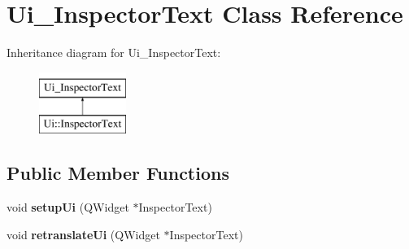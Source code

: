 \hypertarget{class_ui___inspector_text}{}\section{Ui\+\_\+\+Inspector\+Text Class Reference}
\label{class_ui___inspector_text}
Inheritance diagram for Ui\+\_\+\+Inspector\+Text\+:\begin{figure}[H]
\begin{center}
\leavevmode
\includegraphics[height=2.000000cm]{class_ui___inspector_text}
\end{center}
\end{figure}
\subsection*{Public Member Functions}
\begin{DoxyCompactItemize}
\item 
\mbox{\label{class_ui___inspector_text_aa03e74128c2937e69d0da18ec6e53c5d}} 
void {\bfseries setup\+Ui} (Q\+Widget $\ast$Inspector\+Text)
\item 
\mbox{\label{class_ui___inspector_text_a7023cbf8f9251394511ef4f4a62d36d4}} 
void {\bfseries retranslate\+Ui} (Q\+Widget $\ast$Inspector\+Text)
\end{DoxyCompactItemize}
